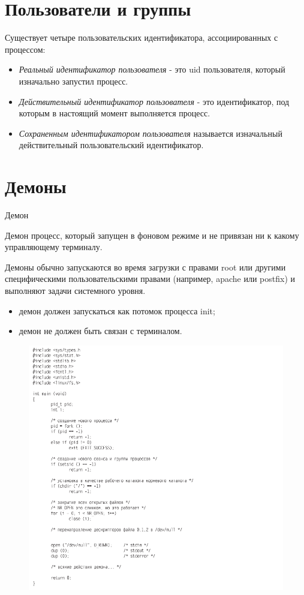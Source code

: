 \documentclass{beamer}
\begin{document}
\section{Пользователи и группы}
\begin{frame}
Существует четыре пользовательских идентификатора, ассоциированных с процессом: \begin{itemize}
\item \textit{Реальный идентификатор пользователя} - это uid пользователя, который изначально запустил процесс.
\item \textit{Действительный идентификатор пользователя} - это идентификатор, под которым в настоящий момент выполняется процесс. 
\item \textit{Сохраненным идентификатором пользователя} называется изначальный действительный пользовательский идентификатор. 
\end{itemize}
\end{frame}

\section{Демоны}
\begin{frame}{Демон}
\begin{block}{Демон}
процесс, который запущен в фоновом режиме и не привязан ни к какому управляющему терминалу.
\end{block}
Демоны обычно запускаются во время загрузки с правами root или другими специфическими пользовательскими правами (например, apache или postfix) и выполняют задачи системного уровня. 
\begin{itemize}
\item демон должен запускаться как потомок процесса init;
\item демон не должен быть связан с терминалом.
\end{itemize}
\end{frame}

\begin{frame}
\begin{figure}[h]
\centering
\includegraphics[scale=0.4]{images/lec07-pic16.png}
\end{figure}
\end{frame}
\end{document}
